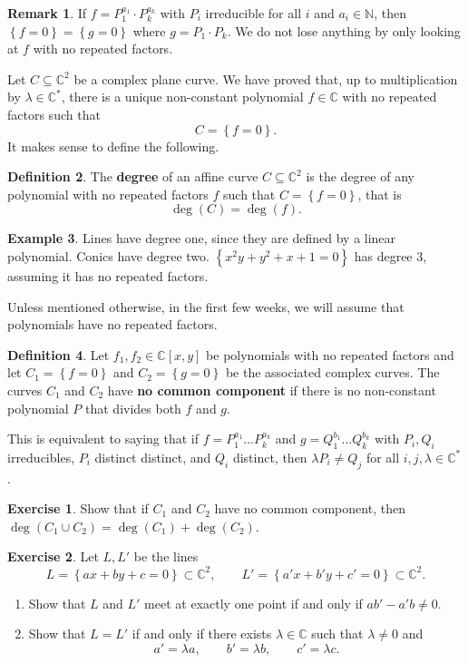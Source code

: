 \documentclass{article}
\newcommand{\N}{\mathbb{N}}
\newcommand{\C}{\mathbb{C}}
\newcommand{\rb}[1]{\left( #1 \right)}
\renewcommand{\sb}[1]{\left[ #1 \right]}
\newcommand{\cb}[1]{\left\{ #1 \right\}}
\theoremstyle{definition}\newtheorem{definition}{Definition}[section]
\theoremstyle{definition}\newtheorem{notation}[definition]{Notation}
\theoremstyle{definition}\newtheorem{remark}[definition]{Remark}
\theoremstyle{definition}\newtheorem{example}[definition]{Example}
\theoremstyle{definition}\newtheorem{fact}{Fact}
\theoremstyle{definition}\newtheorem{exercise}{Exercise}
\begin{document}
\begin{remark}
If $ f = P_1^{a_1} \cdot P_k^{a_k} $ with $ P_i $ irreducible for all $ i $ and $ a_i \in \N $, then $ \cb{f = 0} = \cb{g = 0} $ where $ g = P_1 \cdot P_k $. We do not lose anything by only looking at $ f $ with no repeated factors.
\end{remark}

Let $ C \subseteq \C^2 $ be a complex plane curve. We have proved that, up to multiplication by $ \lambda \in \C^* $, there is a unique non-constant polynomial $ f \in \C $ with no repeated factors such that
$$ C = \cb{f = 0}. $$
It makes sense to define the following.

\begin{definition}
The \textbf{degree} of an affine curve $ C \subseteq \C^2 $ is the degree of any polynomial with no repeated factors $ f $ such that $ C = \cb{f = 0} $, that is
$$ \deg\rb{C} = \deg\rb{f}. $$
\end{definition}

\begin{example}
Lines have degree one, since they are defined by a linear polynomial. Conics have degree two. $ \cb{x^2y + y^2 + x + 1 = 0} $ has degree 3, assuming it has no repeated factors.
\end{example}

Unless mentioned otherwise, in the first few weeks, we will assume that polynomials have no repeated factors.

\begin{definition}
Let $ f_1, f_2 \in \C\sb{x, y} $ be polynomials with no repeated factors and let $ C_1 = \cb{f = 0} $ and $ C_2 = \cb{g = 0} $ be the associated complex curves. The curves $ C_1 $ and $ C_2 $ have \textbf{no common component} if there is no non-constant polynomial $ P $ that divides both $ f $ and $ g $.
\end{definition}

This is equivalent to saying that if $ f = P_1^{a_1} \dots P_k^{a_k} $ and $ g = Q_1^{b_1} \dots Q_k^{b_k} $ with $ P_i, Q_i $ irreducibles, $ P_i $ distinct distinct, and $ Q_i $ distinct, then $ \lambda P_i \ne Q_j $ for all $ i, j, \lambda \in \C^* $.

\begin{exercise}
Show that if $ C_1 $ and $ C_2 $ have no common component, then $ \deg\rb{C_1 \cup C_2} = \deg\rb{C_1} + \deg\rb{C_2} $.
\end{exercise}

\begin{exercise}
Let $ L, L' $ be the lines
$$ L = \cb{ax + by + c = 0} \subset \C^2, \qquad L' = \cb{a'x + b'y + c' = 0} \subset \C^2. $$
\begin{enumerate}
\item Show that $ L $ and $ L' $ meet at exactly one point if and only if $ ab' - a'b \ne 0 $.
\item Show that $ L = L' $ if and only if there exists $ \lambda \in \C $ such that $ \lambda \ne 0 $ and
$$ a' = \lambda a, \qquad b' = \lambda b, \qquad c' = \lambda c. $$
\end{enumerate}
\end{exercise}
\end{document}
